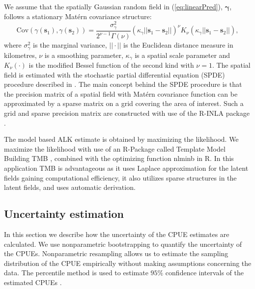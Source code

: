 \documentclass[a4paper 12pt]{article}
\numberwithin{equation}{section}
\begin{document}
\indent We assume that the spatially Gaussian random field in (\ref{eq:linearPred}), $\pmb{\gamma}$, follows a stationary Mat\'{e}rn covariance structure:
\begin{equation}\label{eq:matern}
 \text{Cov}(\gamma(\mathbf{s}_1),\gamma(\mathbf{s}_2)) = \frac{\sigma^2_{\gamma}}{2^{\nu-1}\Gamma(\nu)}(\kappa_{\gamma}||\mathbf{s}_1 -\mathbf{s}_2||)^{\nu}K_{\nu}(\kappa_{\gamma}||\mathbf{s}_1-\mathbf{s}_2||),
\end{equation}
where $\sigma^2_{\gamma}$ is the marginal variance, $||\cdot||$ is the Euclidean distance measure in kilometres, $\nu$ is a smoothing parameter, $\kappa_{\gamma}$ is a spatial scale parameter and $K_{\nu}(\cdot)$ is the modified Bessel function of the second kind with $\nu = 1$. The spatial field is estimated with the stochastic partial differential equation (SPDE) procedure described in \citet{lindgren2011explicit}. The main concept behind the SPDE procedure is that the precision matrix of a spatial field with Mat\'{e}rn  covariance function can be approximated by a sparse matrix on a grid covering the area of interest. Such a grid and sparse precision matrix are constructed with use of the R-INLA package \citep{rue2009approximate}.

The model based ALK estimate is obtained by maximizing the likelihood. We maximize the likelihood with use of an R-Package called Template Model Building {\sffamily TMB} \citep{kristensen2015tmb}, combined with the optimizing function {\sffamily nlminb} in R. In this application {\sffamily TMB} is advantageous as it uses Laplace approximation for the latent fields gaining computational efficiency, it also utilizes sparse structures in the latent fields, and uses automatic derivation. 

\subsection{Uncertainty estimation}
\label{sec:uncertaintyestimation}
In this section we describe how the uncertainty of the CPUE estimates are calculated. We use nonparametric bootstrapping to quantify the uncertainty of the CPUEs. Nonparametric resampling allows us to estimate the sampling distribution of the CPUE empirically without making assumptions concerning the data. The percentile method is used to estimate $95\%$ confidence intervals of the estimated CPUEs \citep{carpenter2000bootstrap}. %
\end{document}
